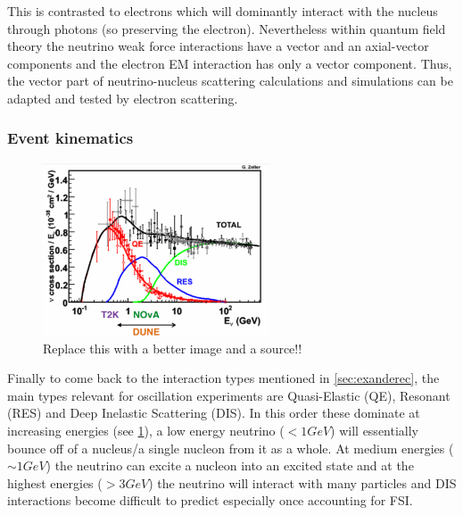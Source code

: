 \documentclass[a4paper,12pt]{article}
\begin{document}
This is contrasted to electrons which will dominantly interact with the nucleus through photons (so preserving the electron).
Nevertheless within quantum field theory the neutrino weak force interactions have a vector and an axial-vector components and the electron EM interaction has only a vector component\cite{alvarez-rusoNuSTEC11NeutrinoScattering2018}.
Thus, the vector part of neutrino-nucleus scattering calculations and simulations can be adapted and tested by electron scattering.

\subsubsection{Event kinematics}


\begin{figure}[h]
    \centering
    \includegraphics[width=0.6\textwidth]{figures/sigmaVsEnu.pdf}
    \caption{
        Replace this with a better image and a source!!
    }\label{fig:nusigma_vs_Enu}
\end{figure}

Finally to come back to the interaction types mentioned in \cref{sec:exanderec}, the main types relevant for oscillation experiments are Quasi-Elastic (QE), Resonant (RES) and Deep Inelastic Scattering (DIS).
In this order these dominate at increasing energies (see \cref{fig:nusigma_vs_Enu}), a low energy neutrino ($<1\si{GeV}$) will essentially bounce off of a nucleus/a single nucleon from it as a whole.
At medium energies ($\sim 1 \si{GeV}$) the neutrino can excite a nucleon into an excited state and at the highest energies ($>3\si{GeV}$) the neutrino will interact with many particles and DIS interactions become difficult to predict especially once accounting for FSI.
\end{document}
